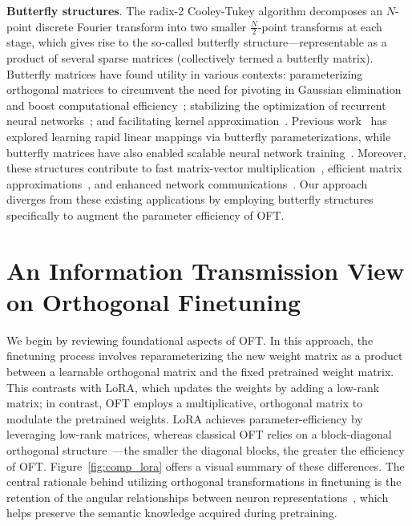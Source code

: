 \textbf{Butterfly structures}. The radix-2 Cooley-Tukey algorithm decomposes an $N$-point discrete Fourier transform into two smaller $\frac{N}{2}$-point transforms at each stage, which gives rise to the so-called butterfly structure—representable as a product of several sparse matrices (collectively termed a butterfly matrix). Butterfly matrices have found utility in various contexts: parameterizing orthogonal matrices to circumvent the need for pivoting in Gaussian elimination and boost computational efficiency~\cite{parker1995random}; stabilizing the optimization of recurrent neural networks~\cite{jing2017tunable}; and facilitating kernel approximation~\cite{munkhoeva2018quadrature}. Previous work~\cite{dao2019learning,dao2019kaleidoscope} has explored learning rapid linear mappings via butterfly parameterizations, while butterfly matrices have also enabled scalable neural network training~\cite{chen2022pixelated,dao2022monarch}. Moreover, these structures contribute to fast matrix-vector multiplication~\cite{michielssen1996multilevel,o2010algorithm}, efficient matrix approximations~\cite{li2015butterfly}, and enhanced network communications~\cite{klasing1994broadcasting,li2003linear,rajasingh2016transmission}. Our approach diverges from these existing applications by employing butterfly structures specifically to augment the parameter efficiency of OFT.

\section{An Information Transmission View on Orthogonal Finetuning}

We begin by reviewing foundational aspects of OFT. In this approach, the finetuning process involves reparameterizing the new weight matrix as a product between a learnable orthogonal matrix and the fixed pretrained weight matrix. This contrasts with LoRA, which updates the weights by adding a low-rank matrix; in contrast, OFT employs a multiplicative, orthogonal matrix to modulate the pretrained weights. LoRA achieves parameter-efficiency by leveraging low-rank matrices, whereas classical OFT relies on a block-diagonal orthogonal structure~\cite{qiu2023controlling}—the smaller the diagonal blocks, the greater the efficiency of OFT. Figure~\ref{fig:comp_lora} offers a visual summary of these differences. The central rationale behind utilizing orthogonal transformations in finetuning is the retention of the angular relationships between neuron representations~\cite{liu2018learning,liu2021orthogonal,qiu2023controlling}, which helps preserve the semantic knowledge acquired during pretraining.

